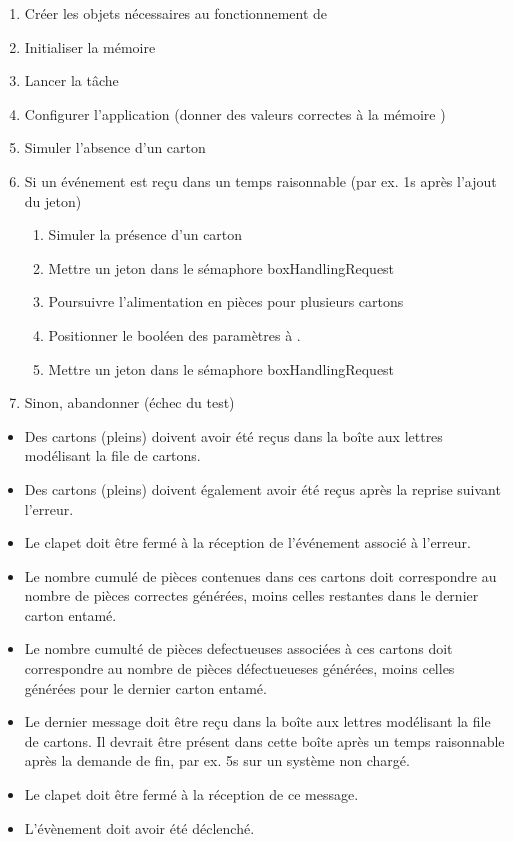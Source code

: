 {
\begin{enumerate}
	\item Créer les objets nécessaires au fonctionnement de 
	\item Initialiser la mémoire 
	\item Lancer la tâche 
	\item Configurer l'application (donner des valeurs correctes à la mémoire )
	\item Simuler l'absence d'un carton
	\item Si un événement  est reçu dans un temps raisonnable (par ex. 1s après l'ajout du jeton)
		\begin{enumerate}
			\item Simuler la présence d'un carton
			\item Mettre un jeton dans le sémaphore boxHandlingRequest
			\item Poursuivre l'alimentation en pièces pour plusieurs cartons
			\item Positionner le booléen  des paramètres à .
			\item Mettre un jeton dans le sémaphore boxHandlingRequest
		\end{enumerate}
	\item Sinon, abandonner (échec du test)
\end{enumerate}
}
{
\begin{itemize}
	\item Des cartons (pleins) doivent avoir été reçus dans la boîte aux lettres modélisant la file de cartons.
	\item Des cartons (pleins) doivent également avoir été reçus après la reprise suivant l'erreur.
	\item Le clapet doit être fermé à la réception de l'événement associé à l'erreur.
	\item Le nombre cumulé de pièces contenues dans ces cartons doit correspondre au nombre de pièces correctes générées, moins celles restantes dans le dernier carton entamé.
	\item Le nombre cumulté de pièces defectueuses associées à ces cartons doit correspondre au nombre de pièces défectueueses générées, moins celles générées pour le dernier carton entamé.
	\item Le dernier message doit être reçu dans la boîte aux lettres modélisant la file de cartons. Il devrait être présent dans cette boîte après un temps raisonnable après la demande de fin, par ex. 5s sur un système non chargé.
	\item Le clapet doit être fermé à la réception de ce message.
	\item L'évènement  doit avoir été déclenché.
\end{itemize}
}

